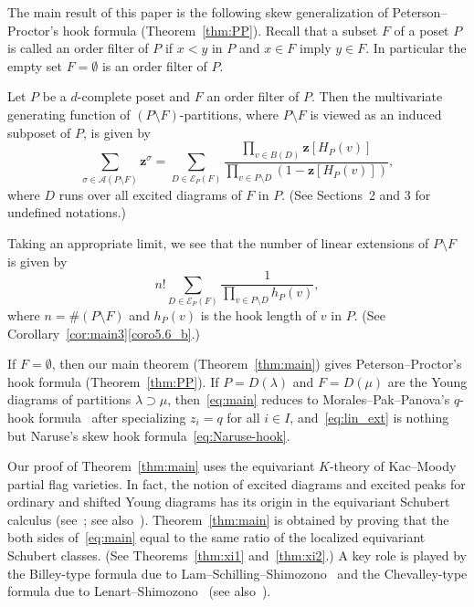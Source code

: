 \documentclass[ALCO,ThmDefs,Unicode,epreuves]{cedram}
\newcommand\vectz{\boldsymbol{z}}
\newcommand\AP{\mathcal{A}}
\newcommand\EE{\mathcal{E}}
\begin{document}
The main result of this paper is the following skew generalization of Peterson--Proctor's 
hook formula (Theorem~\ref{thm:PP}).
Recall that a subset $F$ of a poset $P$ is called an order filter of $P$ if 
$x<y$ in $P$ and $x \in F$ imply $y \in F$.
In particular the empty set $F = \emptyset$ is an order filter of $P$.

\begin{theo}
\label{thm:main}
Let $P$ be a $d$-complete poset and $F$ an order filter of $P$.
Then the multivariate generating function of $(P \setminus F)$-partitions, 
where $P \setminus F$ is viewed as an induced subposet of $P$, is given by
\begin{equation}
\label{eq:main}
\sum_{\sigma \in \AP(P \setminus F)} \vectz^\sigma
 =
\sum_{D \in \EE_P(F)}
 \frac{ \prod_{v \in B(D)} \vectz[H_P(v)] }
 { \prod_{v \in P \setminus D} ( 1 - \vectz[H_P(v)] ) },
\end{equation}
where $D$ runs over all excited diagrams of $F$ in $P$.
(See Sections~2 and 3 for undefined notations.)
\end{theo}

Taking an appropriate limit, we see that 
the number of linear extensions of $P \setminus F$ is given by
\begin{equation}
\label{eq:lin_ext}
n! 
\sum_{D \in \EE_P(F)}
 \frac{ 1 }
 { \prod_{v \in P \setminus D} h_P(v) },
\end{equation}
where $n = \# (P \setminus F)$ and $h_P(v)$ is the hook length of $v$ in $P$.
(See Corollary~\ref{cor:main3}\ref{coro5.6_b}.)

If $F = \emptyset$, then our main theorem (Theorem~\ref{thm:main}) gives 
Peterson--Proctor's hook formula (Theorem~\ref{thm:PP}).
If $P = D(\lambda)$ and $F = D(\mu)$ are the Young diagrams of partitions $\lambda \supset \mu$, 
then~\eqref{eq:main} reduces to Morales--Pak--Panova's $q$-hook formula~\cite[Corollary~6.17]{MPP} 
after specializing $z_i = q$ for all $i \in I$, 
and~\eqref{eq:lin_ext} is nothing but Naruse's skew hook formula~\eqref{eq:Naruse-hook}.

Our proof of Theorem~\ref{thm:main} uses the equivariant $K$-theory of Kac--Moody partial flag varieties.
In fact, the notion of excited diagrams and excited peaks for ordinary and shifted Young diagrams 
has its origin in the equivariant Schubert calculus 
(see~\cite{IN1, IN2}; see also~\cite{GK, KN, Kr1, Kr2}).
Theorem~\ref{thm:main} is obtained by proving that 
the both sides of~\eqref{eq:main} equal to the same ratio of the localized equivariant Schubert classes. 
(See Theorems~\ref{thm:xi1} and~\ref{thm:xi2}.)
A key role is played by the Billey-type formula due to Lam--Schilling--Shimozono~\cite{LSS} 
and the Chevalley-type formula due to Lenart--Shimozono~\cite{LS} (see also~\cite{LP}).
\end{document}
